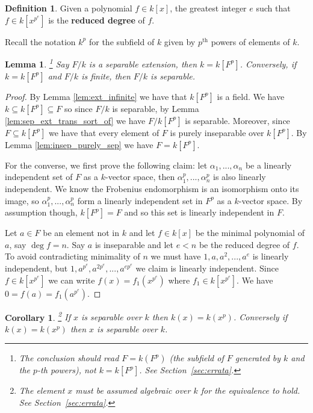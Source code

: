 \documentclass[12pt]{article}
\theoremstyle{plain}
\newtheorem{lemma}[thm]{Lemma}
\newtheorem{cor}[thm]{Corollary}
\theoremstyle{definition}
\newtheorem{defn}[thm]{Definition} %
\begin{document}
\begin{defn}
Given a polynomial $f \in k[x]$, the greatest integer $e$ such that $f \in k[x^{p^e}]$ is the \textbf{reduced degree} of $f$.
\end{defn}
Recall the notation $k^p$ for the subfield of $k$ given by $p^{\operatorname{th}}$ powers of elements of $k$.
\begin{lemma}
\label{lem:sep_ext_condition}\footnote{The conclusion should read $F = k(F^p)$ (the subfield of $F$ generated by $k$ and the $p$-th powers), not $k = k[F^p]$. See Section~\ref{sec:errata}.}
Say $F/k$ is a separable extension, then $k = k[F^p]$. Conversely, if $k = k[F^p]$ and $F/k$ is finite, then $F/k$ is separable.
\end{lemma}
\begin{proof}
By Lemma \ref{lem:ext_infinite} we have that $k[F^p]$ is a field. We have $k \subseteq k[F^p] \subseteq F$ so since $F/k$ is separable, by Lemma \ref{lem:sep_ext_trans_sort_of} we have $F/k[F^p]$ is separable. Moreover, since $F \subseteq k[F^p]$ we have that every element of $F$ is purely inseparable over $k[F^p]$. By Lemma \ref{lem:insep_purely_sep} we have $F = k[F^p]$.

For the converse, we first prove the following claim: let $\alpha_1,...,\alpha_n$ be a linearly independent set of $F$ as a $k$-vector space, then $\alpha_1^p,...,\alpha_n^p$ is also linearly independent. We know the Frobenius endomorphism is an isomorphism onto its image, so $\alpha_1^p,...,\alpha_n^p$ form a linearly independent set in $F^p$ as a $k$-vector space. By assumption though, $k[F^p] = F$ and so this set is linearly independent in $F$.

Let $a \in F$ be an element not in $k$ and let $f \in k[x]$ be the minimal polynomial of $a$, say $\operatorname{deg}f = n$. Say $a$ is inseparable and let $e < n$ be the reduced degree of $f$. To avoid contradicting minimality of $n$ we must have $1, a, a^2,..., a^e$ is linearly independent, but $1,a^{p^e},a^{2p^e},...,a^{ep^e}$ we claim is linearly independent. Since $f \in k[x^{p^e}]$ we can write $f(x) = f_1(x^{p^e})$ where $f_1 \in k[x^{p^e}]$. We have $0 = f(a) = f_1(a^{p^e})$.
\end{proof}
\begin{cor}
\label{cor:base_induct}\footnote{The element $x$ must be assumed algebraic over $k$ for the equivalence to hold. See Section~\ref{sec:errata}.}
If $x$ is separable over $k$ then $k(x) = k(x^p)$. Conversely if $k(x) = k(x^p)$ then $x$ is separable over $k$.
\end{cor}
\end{document}
